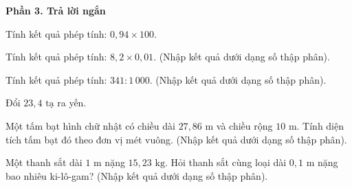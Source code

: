 \textbf{Phần 3. Trả lời ngắn}

\begin{ex} %
Tính kết quả phép tính: $0{,}94 \times 100$.
\end{ex}

\begin{ex} %
Tính kết quả phép tính: $8{,}2 \times 0{,}01$. (Nhập kết quả dưới dạng số thập phân).
\end{ex}

\begin{ex} %
Tính kết quả phép tính: $341 : 1\,000$. (Nhập kết quả dưới dạng số thập phân).
\end{ex}

\begin{ex} %
Đổi $23{,}4\text{ tạ}$ ra yến.
\end{ex}

\begin{ex} %
Một tấm bạt hình chữ nhật có chiều dài $27{,}86\text{ m}$ và chiều rộng $10\text{ m}$. Tính diện tích tấm bạt đó theo đơn vị mét vuông. (Nhập kết quả dưới dạng số thập phân).
\end{ex}

\begin{ex} %
Một thanh sắt dài $1\text{ m}$ nặng $15{,}23\text{ kg}$. Hỏi thanh sắt cùng loại dài $0{,}1\text{ m}$ nặng bao nhiêu ki-lô-gam? (Nhập kết quả dưới dạng số thập phân).
\end{ex}
